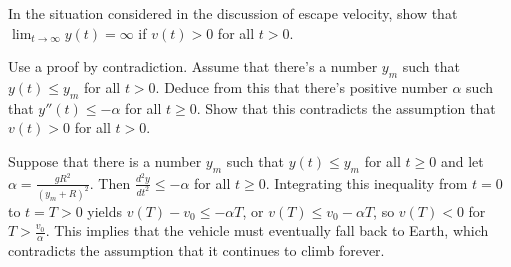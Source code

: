 \documentclass{ximera}
\begin{document}
\begin{problem}\label{exer:4.3.20}
In the situation considered in the discussion of escape velocity, show
that $\lim_{t\to\infty}y(t)=\infty$ if $v(t)>0$ for all $t>0$.

\begin{hint}
    Use a proof by contradiction. Assume that there's a number
$y_m$ such that $y(t)\le y_m$ for all $t>0$. Deduce from this that
there's positive number $\alpha$ such that $y''(t)\le-\alpha$ for all
$t\ge0$. Show that this contradicts the assumption that $v(t)>0$ for
all $t>0$.
\end{hint}

\begin{solution}
Suppose that there is a number $y_m$ such that $y(t)\le y_m$ for all $t\ge0$ and let $\alpha=\frac{gR^2}{(y_m+R)^2}$. Then
$\frac{d^2y}{dt^2}\le-\alpha$ for all $t\ge 0$. Integrating this
inequality from $t=0$ to $t=T>0$ yields $v(T)-v_0\le -\alpha T$, or
$v(T)\le v_0-\alpha T$, so $v(T) < 0$ for $T>\frac{v_0}{\alpha}$.
This implies that the vehicle must eventually fall back to Earth, which contradicts the assumption that it continues to climb forever.
\end{solution}

\end{problem}
\end{document}

